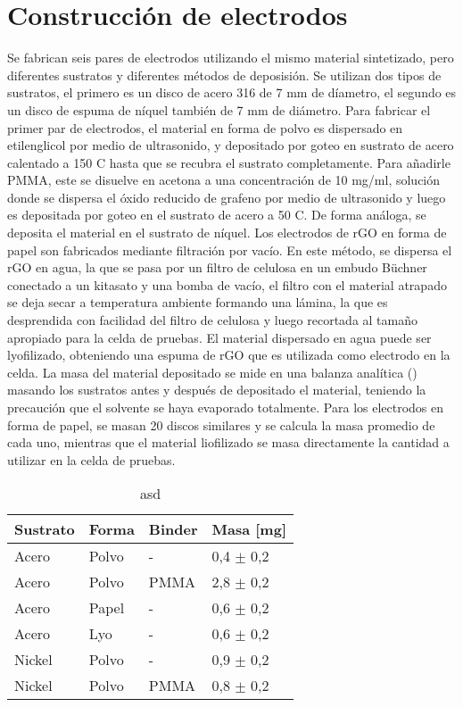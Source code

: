 \section{Construcción de electrodos}
Se fabrican seis pares de electrodos utilizando el mismo material sintetizado, pero diferentes sustratos y diferentes métodos de deposisión. Se utilizan dos tipos de sustratos, el primero es un disco de acero 316 de 7 mm de díametro, el segundo es un disco de espuma de níquel también de 7 mm de diámetro. Para fabricar el primer par de electrodos, el material en forma de polvo es dispersado en etilenglicol por medio de ultrasonido, y depositado por goteo en sustrato de acero calentado a 150 \degree C hasta que se recubra el sustrato completamente. Para añadirle PMMA, este se disuelve en acetona a una concentración de 10 mg/ml, solución donde se dispersa el óxido reducido de grafeno por medio de ultrasonido y luego es depositada por goteo en el sustrato de acero a 50 \degree C. De forma análoga, se deposita el material en el sustrato de níquel.
Los electrodos de rGO en forma de papel son fabricados mediante filtración por vacío. En este método, se dispersa el rGO en agua, la que se pasa por un filtro de celulosa en un embudo Büchner conectado a un kitasato y una bomba de vacío, el filtro con el material atrapado se deja secar a temperatura ambiente formando una lámina, la que es desprendida con facilidad del filtro de celulosa y luego recortada al tamaño apropiado para la celda de pruebas. El material dispersado en agua puede ser lyofilizado, obteniendo una espuma de rGO que es utilizada como electrodo en la celda.
La masa del material depositado se mide en una balanza analítica () masando los sustratos antes y después de depositado el material, teniendo la precaución que el solvente se haya evaporado totalmente. Para los electrodos en forma de papel, se masan 20 discos similares y se calcula la masa promedio de cada uno, mientras que el material liofilizado se masa directamente la cantidad a utilizar en la celda de pruebas.

\begin{table}[htbp]
	\centering
	\caption{asd}
	\begin{tabular}{ l l l l }
		Sustrato & Forma & Binder & Masa [mg] \\ \hline
		Acero    & Polvo & -      & 0,4 $\pm$ 0,2 \\
		Acero    & Polvo & PMMA   & 2,8 $\pm$ 0,2 \\
		Acero    & Papel & -      & 0,6 $\pm$ 0,2 \\
		Acero    & Lyo   & -      & 0,6 $\pm$ 0,2 \\
		Nickel   & Polvo & -      & 0,9 $\pm$ 0,2 \\
		Nickel   & Polvo & PMMA   & 0,8 $\pm$ 0,2 \\
	\end{tabular}
	\label{tab:Electrodos construidos}
\end{table}

